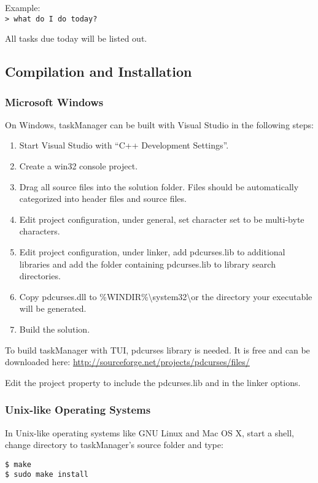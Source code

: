 \documentclass[12pt, a4paper]{article}
\begin{document}
Example:\\
\texttt{\textgreater \ what do I do today?}

All tasks due today will be listed out.    

\subsection{Compilation and Installation}
\subsubsection{Microsoft Windows}

On Windows, taskManager can be built with Visual Studio in the following steps:
\begin{enumerate}
\item Start Visual Studio with ``C++ Development Settings''.
\item Create a win32 console project.
\item Drag all source files into the solution folder. Files should be automatically categorized into header files and source files.
\item Edit project configuration, under general, set character set to be multi-byte characters.
\item Edit project configuration, under linker, add pdcurses.lib to additional libraries and add the folder containing pdcurses.lib to library search directories.
\item Copy pdcurses.dll to \%WINDIR\%\textbackslash system32\textbackslash or the directory your executable will be generated.
\item Build the solution.
\end{enumerate}

To build taskManager with TUI, pdcurses library is needed.
It is free and can be downloaded here:
\url{http://sourceforge.net/projects/pdcurses/files/}

Edit the project property to include the pdcurses.lib and in the linker options.

\subsubsection{Unix-like Operating Systems}

In Unix-like operating systems like GNU Linux and Mac OS X, start a shell, change directory to taskManager's source folder and type:

\noindent \texttt{\$ make\\
  \$ sudo make install}
\end{document}
